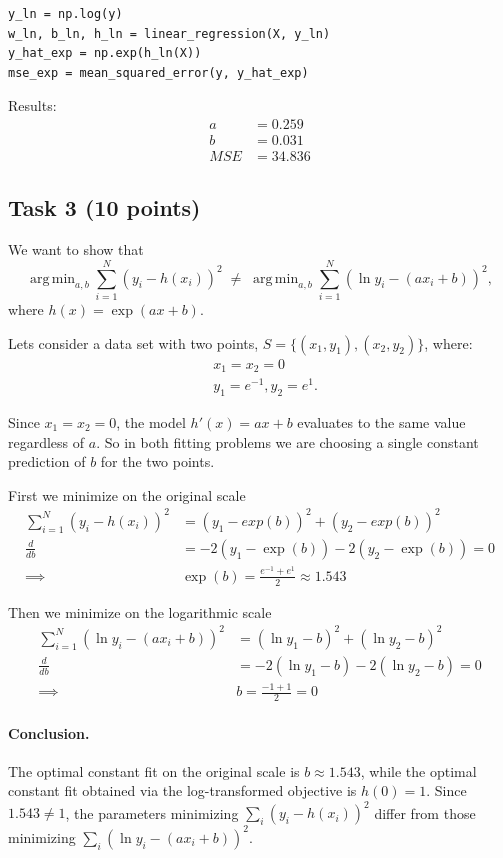 \documentclass[a4paper,12pt]{article}
\DeclareMathOperator*{\argmin}{arg\,min}
\begin{document}
\begin{lstlisting}
y_ln = np.log(y)
w_ln, b_ln, h_ln = linear_regression(X, y_ln)
y_hat_exp = np.exp(h_ln(X))
mse_exp = mean_squared_error(y, y_hat_exp)
\end{lstlisting}

Results:
$$
\begin{aligned}
    a &= 0.259 \\
    b &= 0.031 \\
    MSE &= 34.836
\end{aligned}
$$

\subsection{Task 3 (10 points)}

We want to show that
$$
\argmin_{a,b} \sum_{i=1}^{N} (y_i - h(x_i))^2 \;\neq\; \argmin_{a,b} \sum_{i=1}^{N}
(\ln y_i - (a x_i + b))^2,
$$
where $h(x) = \exp(ax+b)$.

Lets consider a data set with two points, $S = \{(x_1, y_1), (x_2, y_2)\}$, where:
$$
\begin{aligned}
& x_1 = x_2 = 0 \\
& y_1 = e^{-1}, y_2 = e^{1}.
\end{aligned}
$$

Since $x_1 = x_2 = 0$, the model $h'(x) = ax + b$ evaluates to the same value
regardless of $a$. So in both fitting problems we are choosing a single constant
prediction of $b$ for the two points.

First we minimize on the original scale
$$
\begin{aligned}
    \sum_{i=1}^{N} (y_i - h(x_i))^2 &= (y_1 - exp(b))^2 + (y_2 - exp(b))^2 \\
    \frac{d}{db} &= -2(y_1 - \exp(b)) - 2(y_2 - \exp(b)) = 0 \\
        \implies & \exp(b) = \frac{e^{-1} + e^{1}}{2} \approx 1.543
\end{aligned}
$$

Then we minimize on the logarithmic scale
$$
\begin{aligned}
    \sum_{i=1}^{N} (\ln y_i - (a x_i + b))^2 &= (\ln y_1 - b)^2 + (\ln y_2 - b)^2 \\
    \frac{d}{db} &= -2(\ln y_1 - b) - 2(\ln y_2 - b) = 0 \\
        \implies & b = \frac{-1 + 1}{2} = 0
\end{aligned}
$$

\paragraph{Conclusion.} The optimal constant fit on the original scale is
$b \approx 1.543$, while the optimal constant fit obtained via the log-transformed
objective is $h(0) = 1$. Since $1.543 \neq 1$, the parameters minimizing
$\sum_i (y_i - h(x_i))^2$ differ from those minimizing $\sum_i (\ln y_i - (ax_i+b))^2$.
\end{document}
